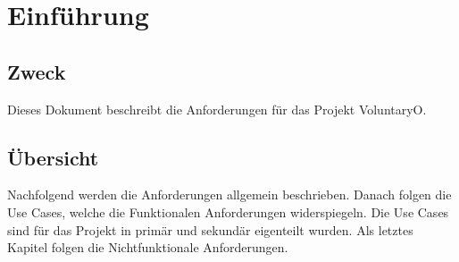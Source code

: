 \chapter{Einführung}
	\section{Zweck}
	Dieses Dokument beschreibt die Anforderungen für das Projekt VoluntaryO.
	
	
	\section{Übersicht}
	Nachfolgend werden die Anforderungen allgemein beschrieben. Danach folgen die Use Cases, welche die Funktionalen Anforderungen widerspiegeln. Die Use Cases sind für das Projekt in primär und sekundär eigenteilt wurden. 
	Als letztes Kapitel folgen die Nichtfunktionale Anforderungen.